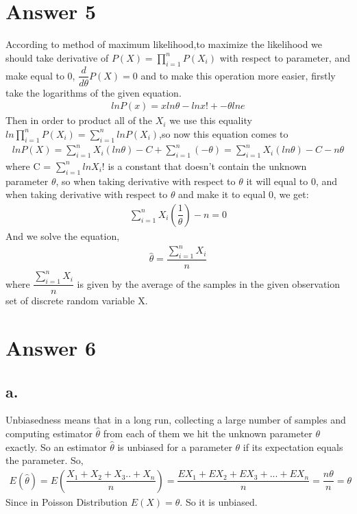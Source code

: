 \documentclass[12pt]{article}
\begin{document}
\section*{Answer 5}
According to method of maximum likelihood,to maximize the likelihood we should take derivative of $P(X)=\prod_{i=1}^{n}P(X_i)$ with respect to parameter, and make equal to 0, $\dfrac{d}{d\theta}P(X) = 0$ and to make this operation more easier, firstly take the logarithms of the given equation.
\begin{gather*}
    lnP(x) = xln\theta - lnx! + -\theta lne
\end{gather*}
Then in order to product all of the $X_i$ we use this equality $ln\prod_{i=1}^{n}P(X_i)=\sum_{i=1}^{n}lnP(X_i)$,so now this equation comes to 
\begin{gather*}
  lnP(X) =  \sum_{i=1}^{n}X_i(ln\theta ) - C +\sum_{i=1}^{n}(-\theta ) = \sum_{i=1}^{n}X_i(ln\theta ) - C -n \theta 
\end{gather*}
where C = $\sum_{i=1}^{n}lnX_i!$ is a constant that doesn't contain the unknown parameter $\theta$, so when taking derivative with respect to $\theta$ it will equal to 0, and when taking derivative with respect to $\theta$ and make it to equal 0, we get:
\begin{gather*}
    \sum_{i=1}^{n}X_i (\dfrac{1}{\theta}) - n = 0 
\end{gather*}
And we solve the equation, 
\begin{gather*}
    \hat{\theta} = \dfrac{\sum_{i=1}^{n}X_i}{n}
\end{gather*}
where $\dfrac{\sum_{i=1}^{n}X_i}{n}$ is given by the average of the samples in the given observation set of discrete random variable X.
\section*{Answer 6}

\subsection*{a.}
Unbiasedness means that in a long run, collecting a large number of samples and computing estimator $\hat{\theta}$ from each of them we hit the unknown parameter $\theta$ exactly. So an estimator $\hat{\theta}$ is unbiased for a parameter $\theta$ if its expectation equals the parameter. So,
\begin{gather*}
    E(\hat{\theta}) = E(\dfrac{X_1+X_2+X_3..+X_n}{n}) = \dfrac{EX_1+EX_2+EX_3+...+EX_n}{n} = \dfrac{n\theta}{n} = \theta
\end{gather*}
Since in Poisson Distribution $E(X)=\theta$. So it is unbiased.
\end{document}
